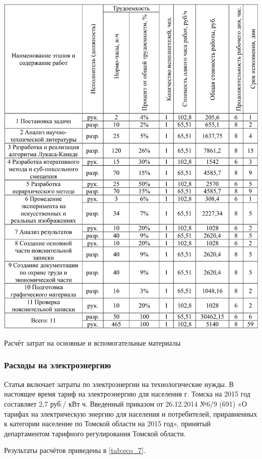 \begin{table}[h!]
\centering
\includegraphics[page=6, width=0.9\linewidth]{econom_table.pdf}
\caption{Расчёт затрат на основные и вспомогательные материалы}
\label{tab:eco_6}
\end{table}


\subsubsection{Расходы на электроэнергию}

Статья включает затраты по электроэнергии на технологические нужды. В настоящее время тариф на электроэнергию для населения г. Томска на 2015 год составляет 2,7 руб./ кВт ч. Введенный приказом от 26.12.2014 {\textquotedbl} №6/9 (691) «О тарифах на электрическую энергию для населения и потребителей, приравненных к категории население по Томской области на 2015 год», принятый департаментом тарифного регулирования Томской области.

Результаты расчётов приведены в \ref{tab:eco_7}.

